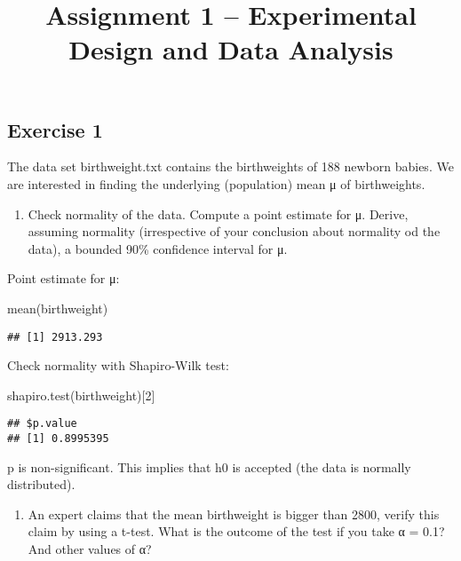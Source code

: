 \documentclass[
]{article}
\title{Assignment 1 -- Experimental Design and Data Analysis}
\author{}
\date{\vspace{-2.5em}}
\newenvironment{Shaded}{\begin{snugshade}}{\end{snugshade}}
\newcommand{\DecValTok}[1]{\textcolor[rgb]{0.00,0.00,0.81}{#1}}
\newcommand{\FunctionTok}[1]{\textcolor[rgb]{0.00,0.00,0.00}{#1}}
\newcommand{\NormalTok}[1]{#1}
\providecommand{\tightlist}{%
  \setlength{\itemsep}{0pt}\setlength{\parskip}{0pt}}
\begin{document}
\maketitle

\hypertarget{exercise-1}{%
\subsection{Exercise 1}\label{exercise-1}}

The data set birthweight.txt contains the birthweights of 188 newborn
babies. We are interested in finding the underlying (population) mean μ
of birthweights.

\begin{enumerate}
\def\labelenumi{\alph{enumi})}
\tightlist
\item
  Check normality of the data. Compute a point estimate for μ. Derive,
  assuming normality (irrespective of your conclusion about normality od
  the data), a bounded 90\% confidence interval for μ.
\end{enumerate}

Point estimate for μ:

\begin{Shaded}
\begin{Highlighting}[]
\FunctionTok{mean}\NormalTok{(birthweight)}
\end{Highlighting}
\end{Shaded}

\begin{verbatim}
## [1] 2913.293
\end{verbatim}

Check normality with Shapiro-Wilk test:

\begin{Shaded}
\begin{Highlighting}[]
\FunctionTok{shapiro.test}\NormalTok{(birthweight)[}\DecValTok{2}\NormalTok{]}
\end{Highlighting}
\end{Shaded}

\begin{verbatim}
## $p.value
## [1] 0.8995395
\end{verbatim}

p is non-significant. This implies that h0 is accepted (the data is
normally distributed).

\begin{enumerate}
\def\labelenumi{\alph{enumi})}
\setcounter{enumi}{1}
\tightlist
\item
  An expert claims that the mean birthweight is bigger than 2800, verify
  this claim by using a t-test. What is the outcome of the test if you
  take α = 0.1? And other values of α?
\end{enumerate}
\end{document}
